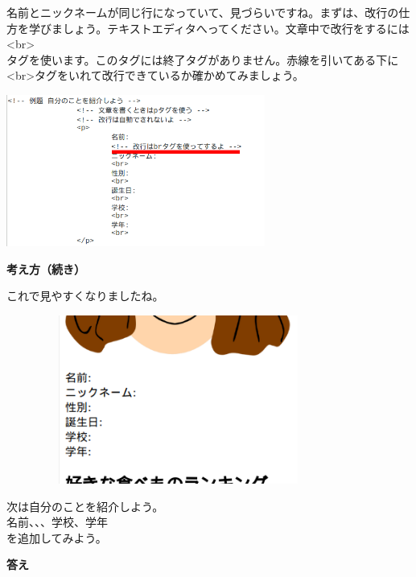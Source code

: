 \documentclass[a4paper,12pt]{jarticle}
\begin{document}
\bigskip

\flushleft
名前とニックネームが同じ行になっていて、見づらいですね。まずは、改行の仕方を学びましょう。テキストエディタへってください。文章中で改行をするには\\
{\textless}br{\textgreater} \ \ \ \ \ \\
タグを使います。このタグには終了タグがありません。赤線を引いてある下に{\textless}br{\textgreater}タグをいれて改行できているか確かめてみましょう。


\centering
\includegraphics[width=8.504cm,height=4.983cm]{textbook-img174.png}

\clearpage
\flushleft

\textbf{考え方（続き）}


これで見やすくなりましたね。

\bigskip


\includegraphics[width=11.28cm,height=5.526cm]{textbook-img176.png}

\bigskip

次は自分のことを紹介しよう。\\
名前、、、学校、学年\\
を追加してみよう。



\bigskip

\bigskip


\textbf{答え}


\bigskip
\end{document}
